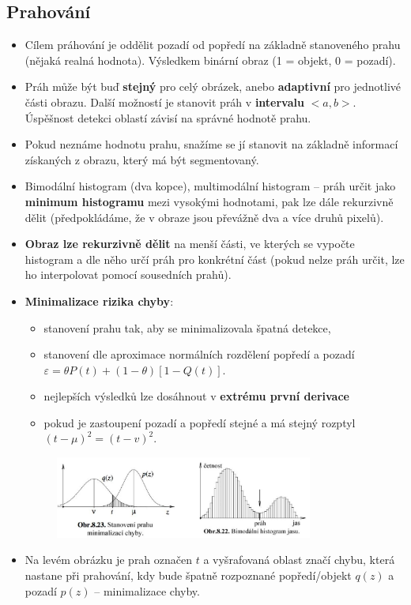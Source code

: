 
\subsection{Prahování}
\begin{itemize}
	\item Cílem práhování je oddělit pozadí od popředí na základně stanoveného prahu (nějaká realná hodnota). Výsledkem binární obraz (1 = objekt, 0 = pozadí).
	\item Práh může být buď \textbf{stejný} pro celý obrázek, anebo \textbf{adaptivní} pro jednotlivé části obrazu. Další možností je stanovit práh v \textbf{intervalu} $<a, b>$. Úspěšnost detekci oblastí závisí na správné hodnotě prahu.
	\item Pokud neznáme hodnotu prahu, snažíme se jí stanovit na základně informací získaných z obrazu, který má být segmentovaný.
	\item Bimodální histogram (dva kopce), multimodální histogram -- práh určit jako \textbf{minimum histogramu} mezi vysokými hodnotami, pak lze dále rekurzivně dělit (předpokládáme, že v obraze jsou převážně dva a více druhů pixelů).
	\item \textbf{Obraz lze rekurzivně dělit} na menší části, ve kterých se vypočte histogram a dle něho určí práh pro konkrétní část (pokud nelze práh určit, lze ho interpolovat pomocí sousedních prahů).
	\item \textbf{Minimalizace rizika chyby}:
	\begin{itemize}
		\item stanovení prahu tak, aby se minimalizovala špatná detekce,
		\item stanovení dle aproximace normálních rozdělení popředí a pozadí \\$\varepsilon = \theta P(t) + (1 - \theta)[1 - Q(t)]$.
		\item nejlepších výsledků lze dosáhnout v \textbf{extrému první derivace}
		\item pokud je zastoupení pozadí a popředí stejné a má stejný rozptyl $(t - \mu )^2 = (t - v)^2 $.
	\end{itemize}
	\begin{figure}[H]
\centering
\includegraphics[width=0.8\textwidth]{assets/8_prah_histogram}
\end{figure}
\item Na levém obrázku je prah označen $t$ a vyšrafovaná oblast značí chybu, která nastane při prahování, kdy bude špatně rozpoznané popředí/objekt $q(z)$ a pozadí $p(z)$ -- minimalizace chyby. 
\end{itemize}


